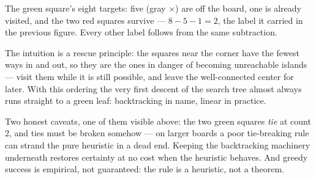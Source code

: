 \documentclass[11pt]{article}
\begin{document}
\begin{center}

\smallskip
The green square's eight targets: five (gray $\times$) are off the board,
one is already visited, and the two red squares survive ---
$8 - 5 - 1 = 2$, the label it carried in the previous figure. Every other
label follows from the same subtraction.
\end{center}

The intuition is a rescue principle: the squares near the corner have the
fewest ways in and out, so they are the ones in danger of becoming
unreachable islands --- visit them while it is still possible, and leave
the well-connected center for later. With this ordering the very first
descent of the search tree almost always runs straight to a green leaf:
backtracking in name, linear in practice.

Two honest caveats, one of them visible above: the two green squares
\emph{tie} at count 2, and ties must be broken somehow --- on larger
boards a poor tie-breaking rule can strand the pure heuristic in a dead
end. Keeping the backtracking machinery underneath restores certainty at
no cost when the heuristic behaves. And greedy success is empirical, not
guaranteed: the rule is a heuristic, not a theorem.
\end{document}
